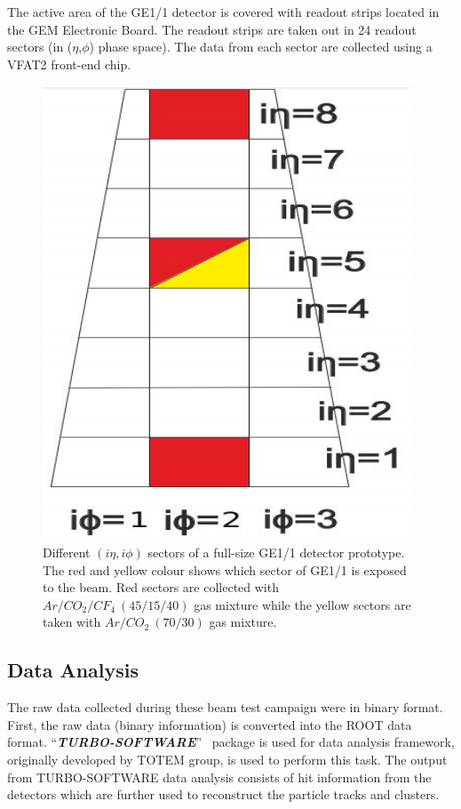 The active area of the GE1/1 detector is covered with readout strips located in the GEM Electronic Board. 
The readout strips are taken out in 24 readout sectors (in ($\eta$,$\phi$) phase space).
The data from each sector are collected using a VFAT2 front-end chip. 


\begin{figure}[!htbp]
\centering
\includegraphics[scale=0.5,angle=90]{figures/GEM/GE11.png}
\caption{Different $(i\eta,i\phi)$ sectors of a full-size GE1/1 detector prototype. The red and yellow colour shows which sector of GE1/1 is exposed to the beam. Red sectors are collected with $Ar/CO_2/CF_4~(45/15/40)$ gas mixture while the yellow sectors are taken with $Ar/CO_2~(70/30)$ gas mixture.}
\label{GE1/1}
\end{figure}
\subsection{Data Analysis} %
\label{sub:test_beam_analysis}
The raw data collected during these beam test campaign were in binary format. First, the raw data (binary information) is converted into the ROOT data format. ``\textit{\textbf{TURBO-SOFTWARE}}''~\cite{git-trubosoftware} package is used for data analysis framework, originally developed by TOTEM group, is used to perform this task. The output from TURBO-SOFTWARE data analysis consists of hit information from the detectors which are further used to reconstruct the particle tracks and clusters. 

